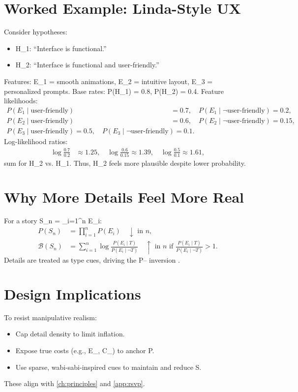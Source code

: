 \documentclass[openany]{book}
\newcommand{\PhiS}{\Phi} %
\newcommand{\Sent}{S} %
\newcommand{\Eint}{E_{\mathrm{int}}} %
\newcommand{\Cfoot}{C_{\mathrm{foot}}} %
\begin{document}
\section{Worked Example: Linda-Style UX}
\label{sec:conj-example}
Consider hypotheses:
\begin{itemize}
  \item H_1: \textquotedblleft Interface is functional.\textquotedblright
  \item H_2: \textquotedblleft Interface is functional and user-friendly.\textquotedblright
\end{itemize}
Features: E_1 = smooth animations, E_2 = intuitive layout, E_3 = personalized prompts. Base rates: P(H_1) = 0.8, P(H_2) = 0.4. Feature likelihoods:
\begin{align*}
P(E_1 \mid \text{user-friendly}) &= 0.7, \quad P(E_1 \mid \neg \text{user-friendly}) = 0.2, \\
P(E_2 \mid \text{user-friendly}) &= 0.6, \quad P(E_2 \mid \neg \text{user-friendly}) = 0.15, \\
P(E_3 \mid \text{user-friendly}) = 0.5, \quad P(E_3 \mid \neg \text{user-friendly}) = 0.1.
\end{align*}
Log-likelihood ratios:
\begin{align*}
\log \frac{0.7}{0.2} &\approx 1.25, \quad \log \frac{0.6}{0.15} \approx 1.39, \quad \log \frac{0.5}{0.1} \approx 1.61,
\end{align*}
sum  for H_2 vs. H_1. Thus, H_2 feels more plausible despite lower probability.

\section{Why More Details Feel More Real}
\label{sec:conj-why}
For a story S_n = \bigwedge_{i=1}^n E_i:
\begin{align*}
P(S_n) &= \prod_{i=1}^n P(E_i) \quad \downarrow \text{ in } n, \\
\mathcal{B}(S_n) &= \sum_{i=1}^n \log \frac{P(E_i \mid T)}{P(E_i \mid \neg T)} \quad \uparrow \text{ in } n \text{ if } \frac{P(E_i \mid T)}{P(E_i \mid \neg T)} > 1.
\end{align*}
Details are treated as type cues, driving the P-- inversion \citep{tversky1983}.

\section{Design Implications}
\label{sec:conj-implications}
To resist manipulative realism:
\begin{itemize}
  \item Cap detail density to limit  inflation.
  \item Expose true costs (e.g., \Eint{}, \Cfoot{}) to anchor P.
  \item Use sparse, wabi-sabi-inspired cues to maintain \PhiS{} and reduce \Sent{}.
\end{itemize}
These align with \cref{ch:principles} and \cref{app:rsvp}.
\end{document}
